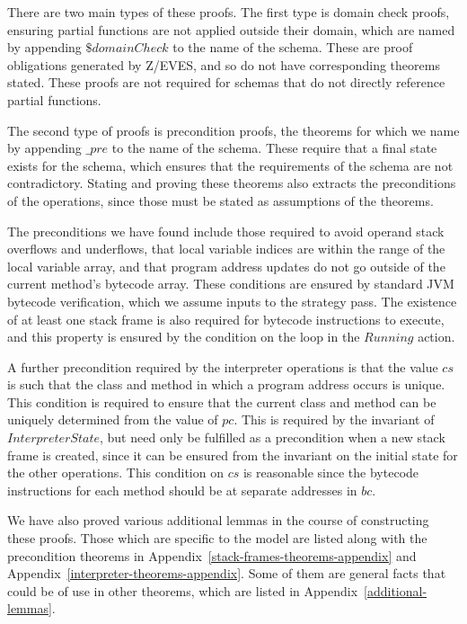 There are two main types of these proofs.
The first type is domain check proofs, ensuring partial functions are
not applied outside their domain, which are named by appending
$\$domainCheck$ to the name of the schema.
These are proof obligations generated by Z/EVES, and so do not have
corresponding theorems stated.
These proofs are not required for schemas that do not directly
reference partial functions.

The second type of proofs is precondition proofs, the theorems for
which we name by appending $\_pre$ to the name of the schema.
These require that a final state exists for the schema, which ensures
that the requirements of the schema are not contradictory.
Stating and proving these theorems also extracts the preconditions of
the operations, since those must be stated as assumptions of the
theorems.

The preconditions we have found include those required to avoid
operand stack overflows and underflows, that local variable indices
are within the range of the local variable array, and that program
address updates do not go outside of the current method's bytecode
array.
These conditions are ensured by standard JVM bytecode verification,
which we assume inputs to the strategy pass.
The existence of at least one stack frame is also required for
bytecode instructions to execute, and this property is ensured by the
condition on the loop in the $Running$ action.

A further precondition required by the interpreter operations is that
the value $cs$ is such that the class and method in which a program
address occurs is unique.
This condition is required to ensure that the current class and method
can be uniquely determined from the value of $pc$.
This is required by the invariant of $InterpreterState$, but need only
be fulfilled as a precondition when a new stack frame is created,
since it can be ensured from the invariant on the initial state for
the other operations.
This condition on $cs$ is reasonable since the bytecode instructions
for each method should be at separate addresses in $bc$.

We have also proved various additional lemmas in the course of
constructing these proofs.
Those which are specific to the model are listed along with the
precondition theorems in Appendix~\ref{stack-frames-theorems-appendix}
and Appendix~\ref{interpreter-theorems-appendix}.
Some of them are general facts that could be of use in other theorems,
which are listed in Appendix~\ref{additional-lemmas}.

